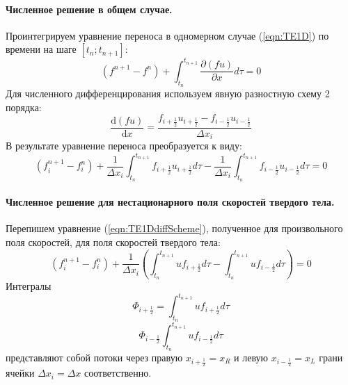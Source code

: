 \documentclass[12pt,a4paper]{article}
\begin{document}
\paragraph{Численное решение в общем случае.}
Проинтегрируем уравнение переноса в одномерном случае (\ref{eqn:TE1D}) по времени на шаге $[t_n; t_{n+1}]$:
\[
(f^{n+1}-f^n)+\int_{t_n}^{t_{n+1}}\frac{\partial(f u)}{\partial x}d\tau=0
\]
Для численного дифференцирования используем явную разностную схему 2 порядка:
\[
\frac{\text{d}(f u)}{\text{d}x}=\frac{f_{i+\frac{1}{2}}u_{i+\frac{1}{2}}-f_{i-\frac{1}{2}}u_{i-\frac{1}{2}}}{\Delta x_i}
\]
В результате уравнение переноса преобразуется к виду:
\begin{equation}
\label{eqn:TE1DdiffScheme}
(f_i^{n+1}-f_i^n)
+
\frac{1}{\Delta x_i}
\int_{t_n}^{t_{n+1}}
f_{i+\frac{1}{2}}u_{i+\frac{1}{2}}d\tau
-
\frac{1}{\Delta x_i}
\int_{t_n}^{t_{n+1}}
f_{i-\frac{1}{2}}u_{i-\frac{1}{2}} d\tau
=0
\end{equation}

\paragraph{Численное решение для нестационарного поля скоростей твердого тела.}
Перепишем уравнение (\ref{eqn:TE1DdiffScheme}), полученное для произвольного поля скоростей, для поля скоростей твердого тела:
\[
(f_i^{n+1}-f_i^n)
+
\frac{1}{\Delta x_i} (
\int_{t_n}^{t_{n+1}}
{u}f_{i+\frac{1}{2}}d\tau
-
\int_{t_n}^{t_{n+1}}
{u}f_{i-\frac{1}{2}}d\tau
)=0
\]
Интегралы
\begin{equation}
\label{eqn:FlowR}
\Phi_{i+\frac{1}{2}}=\int_{t_n}^{t_{n+1}}
{u}f_{i+\frac{1}{2}}d\tau
\end{equation}
\begin{equation}
\label{eqn:FlowL}
\Phi_{i-\frac{1}{2}}\int_{t_n}^{t_{n+1}}
{u}f_{i-\frac{1}{2}}d\tau
\end{equation}
представляют собой потоки через правую $x_{i+\frac{1}{2}}=x_R$ и левую $x_{i-\frac{1}{2}}=x_L$ грани ячейки $\Delta x_i = \Delta x$ соответственно.\\
\end{document}
